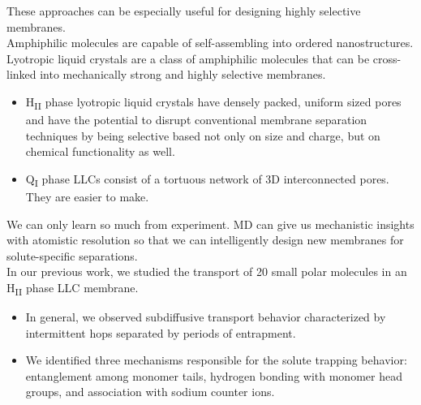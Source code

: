 \documentclass{article}
\begin{document}

  These approaches can be especially useful for designing highly selective membranes. \\

  \noindent Amphiphilic molecules are capable of self-assembling into ordered nanostructures.\\

  Lyotropic liquid crystals are a class of amphiphilic molecules that can be cross-linked
  into mechanically strong and highly selective membranes.
  \begin{itemize}
  	\item H\textsubscript{II} phase lyotropic liquid crystals have densely packed, uniform
	sized pores and have the potential to disrupt conventional membrane separation
	techniques by being selective based not only on size and charge, but on chemical
	functionality as well.
	\item Q\textsubscript{I} phase LLCs consist of a tortuous network of 3D interconnected
	pores. They are easier to make.
  \end{itemize}

  We can only learn so much from experiment. MD can give us mechanistic insights with
  atomistic resolution so that we can intelligently design new membranes for 
  solute-specific separations.\\

  \noindent In our previous work, we studied the transport of 20 small polar molecules
  in an H\textsubscript{II} phase LLC membrane.
  \begin{itemize}
    \item In general, we observed subdiffusive transport behavior characterized by 
    intermittent hops separated by periods of entrapment.
    \item We identified three mechanisms responsible for the solute trapping behavior:
    entanglement among monomer tails, hydrogen bonding with monomer head groups, and
    association with sodium counter ions.
  \end{itemize}
\end{document}
